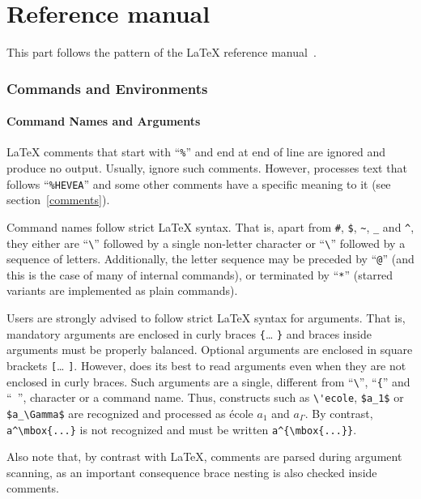 \part{Reference manual}
\label{referencemanual}
This part follows the pattern of the \LaTeX{} reference
manual~\cite[Appendix~C]{latex}.

\section{Commands and Environments}

\subsection{Command Names and Arguments}

\LaTeX{} comments that start with ``\verb+%+'' %
and end at end of line are ignored and produce no output.
Usually, \hevea{} ignore such comments. However, \hevea{} processes
text that follows ``\verb+%HEVEA+'' %
and some other comments have a specific meaning to it (see
section~\ref{comments}).

Command names follow strict \LaTeX{} syntax. That is, apart from
\verb+#+, \verb+$+, %
\verb+~+, \verb+_+ and \verb+^+, they either are
``\verb+\+'' followed by a single non-letter character or
``\verb+\+'' followed by a sequence of letters.
Additionally, the letter sequence may be preceded by ``\verb+@+''
(and this is the case of many of \hevea{} internal commands), or
terminated by ``\verb+*+'' (starred variants are implemented as plain
commands).

Users are strongly advised to follow strict \LaTeX{} syntax for
arguments. That is, mandatory arguments are enclosed in curly braces
\verb+{+\ldots{} \verb+}+ and braces inside arguments must be properly
balanced.
Optional arguments are enclosed in square brackets \verb+[+\ldots{}
\verb+]+.
However, \hevea{} does its best to read arguments even when they are
not enclosed in curly braces.
Such arguments are a single, different from ``\verb+\+'', ``\verb+{+''
and ``\verb+ +'', character or
a command name.
Thus, constructs such as \verb+\'ecole+,
\verb+$a_1$+ or \verb+$a_\Gamma$+ are
recognized and processed as \'ecole $a_1$ and $a_\Gamma$.
By contrast, \verb+a^\mbox{...}+ is not recognized
and must be written  \verb+a^{\mbox{...}}+.

Also note that, by contrast with \LaTeX{}, comments are parsed during
argument scanning, as an important consequence brace nesting is also
checked inside comments.

